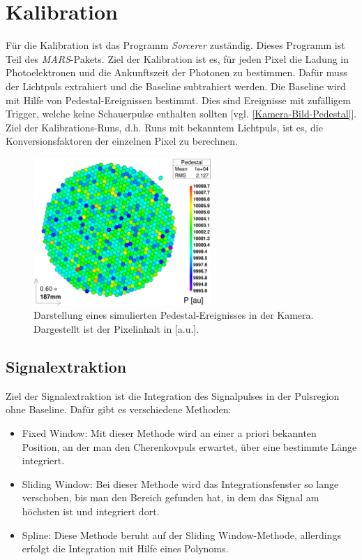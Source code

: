 \section{Kalibration}
\label{sec:Calibration}
Für die Kalibration ist das Programm \textit{Sorcerer} zuständig. 
Dieses Programm ist Teil des \textit{MARS}-Pakets.
Ziel der Kalibration ist es, für jeden Pixel die Ladung in Photoelektronen und die Ankunftszeit der Photonen zu bestimmen.
Dafür muss der Lichtpuls extrahiert und die Baseline subtrahiert werden.
Die Baseline wird mit Hilfe von Pedestal-Ereignissen bestimmt. 
Dies sind Ereignisse mit zufälligem Trigger, welche keine Schauerpulse enthalten sollten [vgl. \autoref{Kamera-Bild-Pedestal}].
Ziel der Kalibrations-Runs, d.h.  Runs mit bekanntem Lichtpuls, ist es, die Konversionsfaktoren der einzelnen Pixel zu berechnen.

\begin{figure}
    \centering
    \includegraphics[width=0.6\textwidth]{./Plots/03_MonteCarlos/Pedestal_fertig.png}
    \caption{Darstellung eines simulierten Pedestal-Ereignisses in der Kamera. Dargestellt ist der Pixelinhalt in [a.u.].}
    \label{Kamera-Bild-Pedestal}
\end{figure}


\subsection{Signalextraktion}
Ziel der Signalextraktion ist die Integration des Signalpulses in der Pulsregion ohne Baseline.
Dafür gibt es verschiedene Methoden:
\begin{itemize}
 \item Fixed Window: Mit dieser Methode wird an einer a priori bekannten Position, an der man den Cherenkovpuls erwartet, über eine bestimmte Länge integriert.
 \item Sliding Window: Bei dieser Methode wird das Integrationsfenster so lange verschoben, bis man den Bereich gefunden hat, in dem das Signal am höchsten ist und integriert dort.
 \item Spline: Diese Methode beruht auf der Sliding Window-Methode, allerdings erfolgt die Integration mit Hilfe eines Polynoms.
\end{itemize}

